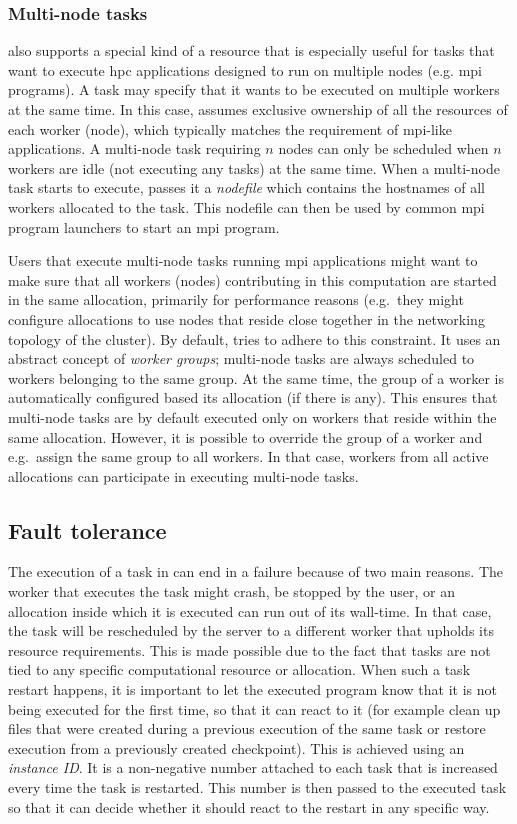 \subsubsection*{Multi-node tasks}
\hyperqueue{} also supports a special kind of a resource that is especially useful for
tasks that want to execute \gls{hpc} applications designed to run on multiple nodes
(e.g. \gls{mpi} programs). A task may specify that it wants to be executed on
multiple workers at the same time. In this case, \hq{} assumes exclusive
ownership of all the resources of each worker (node), which typically matches the requirement of
\gls{mpi}-like applications. A multi-node task requiring $n$ nodes
can only be scheduled when $n$ workers are idle (not executing any tasks) at the
same time. When a multi-node task starts to execute, \hq{} passes it a
\emph{nodefile} which contains the hostnames of all workers allocated to the task. This
nodefile can then be used by common \gls{mpi} program launchers to start an
\gls{mpi} program.

Users that execute multi-node tasks running \gls{mpi} applications might want to make
sure that all workers (nodes) contributing in this computation are started in the same allocation,
primarily for performance reasons (e.g.\ they might configure allocations to use nodes that reside
close together in the networking topology of the cluster). By default, \hyperqueue{}
tries to adhere to this constraint. It uses an abstract concept of \emph{worker groups};
multi-node tasks are always scheduled to workers belonging to the same group. At the same time, the
group of a worker is automatically configured based its allocation (if there is any). This ensures
that multi-node tasks are by default executed only on workers that reside within the same
allocation. However, it is possible to override the group of a worker and e.g.\ assign the same
group to all workers. In that case, workers from all active allocations can participate in
executing multi-node tasks.

\subsection{Fault tolerance}
The execution of a task in \hyperqueue{} can end in a failure because of two main
reasons. The worker that executes the task might crash, be stopped by the user, or an allocation
inside which it is executed can run out of its wall-time. In that case, the task will be
rescheduled by the server to a different worker that upholds its resource requirements. This is
made possible due to the fact that tasks are not tied to any specific computational resource or
allocation. When such a task restart happens, it is important to let the executed program know that
it is not being executed for the first time, so that it can react to it (for example clean up files
that were created during a previous execution of the same task or restore execution from a
previously created checkpoint). This is achieved using an \emph{instance ID}. It is a
non-negative number attached to each task that is increased every time the task is restarted. This
number is then passed to the executed task so that it can decide whether it should react to the
restart in any specific way.

